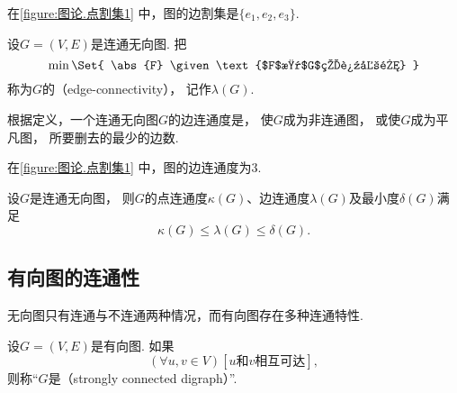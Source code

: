 在\cref{figure:图论.点割集1} 中，图的边割集是\(\{e_1,e_2,e_3\}\).

\begin{definition}
设\(G = (V,E)\)是连通无向图.
把\[
	\min\Set{
		\abs{F}
		\given
		\text{$F$是$G$的边割集}
	}
\]称为\(G\)的（edge-connectivity），
记作\(\lambda(G)\).
\end{definition}

根据定义，一个连通无向图\(G\)的边连通度是，
使\(G\)成为非连通图，
或使\(G\)成为平凡图，
所要删去的最少的边数.

在\cref{figure:图论.点割集1} 中，图的边连通度为\(3\).

\begin{theorem}
设\(G\)是连通无向图，
则\(G\)的点连通度\(\kappa(G)\)、边连通度\(\lambda(G)\)及最小度\(\delta(G)\)满足\[
	\kappa(G)
	\leq
	\lambda(G)
	\leq
	\delta(G).
\]
\end{theorem}

\subsection{有向图的连通性}
无向图只有连通与不连通两种情况，而有向图存在多种连通特性.

\begin{definition}
设\(G = (V,E)\)是有向图.
如果\[
	(\forall u,v \in V)
	\left[
		\text{$u$和$v$相互可达}
	\right],
\]
则称“\(G\)是（strongly connected digraph）”.
\end{definition}

